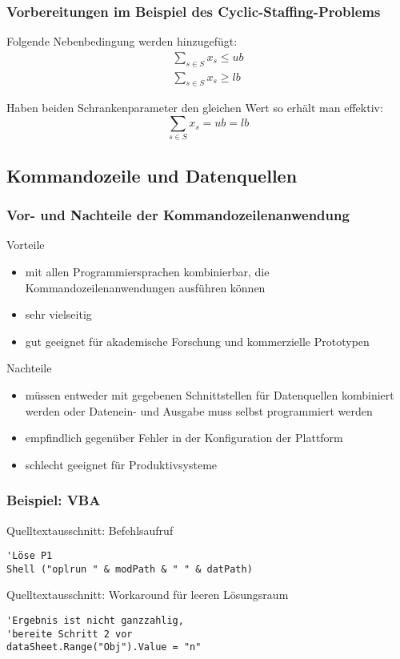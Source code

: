 \begin{frame}
 \frametitle{Vorbereitungen im Beispiel des Cyclic-Staffing-Problems}
 Folgende Nebenbedingung werden hinzugefügt:
 \begin{gather*}
  \sum_{s\in S}x_s \leq ub\label{eq:CyclicStaffingUB}\\
  \sum_{s\in S}x_s \geq lb\label{eq:CyclicStaffingLB}
 \end{gather*}
 
 Haben beiden Schrankenparameter den gleichen Wert so erhält man effektiv:
 \[
  \sum_{s\in S}x_s = ub = lb
 \]
\end{frame}

\subsection{Kommandozeile und Datenquellen}
\begin{frame}
 \frametitle{Vor- und Nachteile der Kommandozeilenanwendung}
 \footnotesize
 \begin{block}{Vorteile}
  \begin{itemize}
   \item mit allen Programmiersprachen kombinierbar, die Kommandozeilenanwendungen ausführen können
   \item sehr vielseitig
   \item gut geeignet für akademische Forschung und kommerzielle Prototypen
  \end{itemize}
 \end{block}
 \pause
 \begin{block}{Nachteile}
  \begin{itemize}
   \item müssen entweder mit gegebenen Schnittstellen für Datenquellen kombiniert werden oder Datenein- und Ausgabe muss selbst programmiert werden
   \item empfindlich gegenüber Fehler in der Konfiguration der Plattform
   \item schlecht geeignet für Produktivsysteme
  \end{itemize}
 \end{block}
\end{frame}

\begin{frame}[fragile]
 \frametitle{Beispiel: VBA}
 \begin{block}{Quelltextausschnitt: Befehlsaufruf}
  \begin{lstlisting}[language={[Visual]Basic},showstringspaces=false,numbers=none,basictype=\scriptsize\ttfamily]
'Löse P1
Shell ("oplrun " & modPath & " " & datPath)
  \end{lstlisting}
 \end{block}
 \begin{block}{Quelltextausschnitt: Workaround für leeren Lösungsraum}
    \begin{lstlisting}[language={[Visual]Basic},showstringspaces=false]
'Ergebnis ist nicht ganzzahlig, 
'bereite Schritt 2 vor
dataSheet.Range("Obj").Value = "n"
  \end{lstlisting}
 \end{block}
\end{frame}


